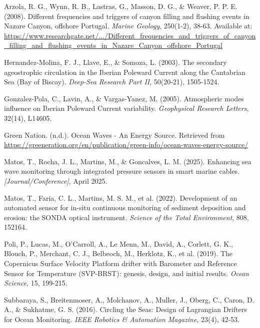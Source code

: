 \begin{thebibliography}{99}

    Arzola, R. G., Wynn, R. B., Lastras, G., Masson, D. G., \& Weaver, P. P. E. (2008). 
    Different frequencies and triggers of canyon filling and flushing events in Nazare Canyon, offshore Portugal. 
    \textit{Marine Geology}, 250(1-2), 38-63. 
    Available at: \url{https://www.researchgate.net/.../Different_frequencies_and_triggers_of_canyon_filling_and_flushing_events_in_Nazare_Canyon_offshore_Portugal}
    
    Hernandez-Molina, F. J., Llave, E., \& Somoza, L. (2003). 
    The secondary ageostrophic circulation in the Iberian Poleward Current along the Cantabrian Sea (Bay of Biscay). 
    \textit{Deep-Sea Research Part II}, 50(20-21), 1505-1524.
    
    Gonzalez-Pola, C., Lavin, A., \& Vargas-Yanez, M. (2005). 
    Atmospheric modes influence on Iberian Poleward Current variability. 
    \textit{Geophysical Research Letters}, 32(14), L14605.
    
    Green Nation. (n.d.). 
    Ocean Waves - An Energy Source. 
    Retrieved from \url{https://greeneration.org/en/publication/green-info/ocean-waves-energy-source/}
    
    Matos, T., Rocha, J. L., Martins, M., \& Goncalves, L. M. (2025). 
    Enhancing sea wave monitoring through integrated pressure sensors in smart marine cables. 
    \textit{[Journal/Conference]}, April 2025.
    
    Matos, T., Faria, C. L., Martins, M. S. M., et al. (2022). 
    Development of an automated sensor for in-situ continuous monitoring of sediment deposition and erosion: the SONDA optical instrument. 
    \textit{Science of the Total Environment}, 808, 152164. 
    
    Poli, P., Lucas, M., O'Carroll, A., Le Menn, M., David, A., Corlett, G. K., Blouch, P., Merchant, C. J., Belbeoch, M., Herklotz, K., et al. (2019). 
    The Copernicus Surface Velocity Platform drifter with Barometer and Reference Sensor for Temperature (SVP-BRST): genesis, design, and initial results. 
    \textit{Ocean Science}, 15, 199-215.
    
    Subbaraya, S., Breitenmoser, A., Molchanov, A., Muller, J., Oberg, C., Caron, D. A., \& Sukhatme, G. S. (2016). 
    Circling the Seas: Design of Lagrangian Drifters for Ocean Monitoring. 
    \textit{IEEE Robotics \& Automation Magazine}, 23(4), 42-53.
    

\end{thebibliography}
